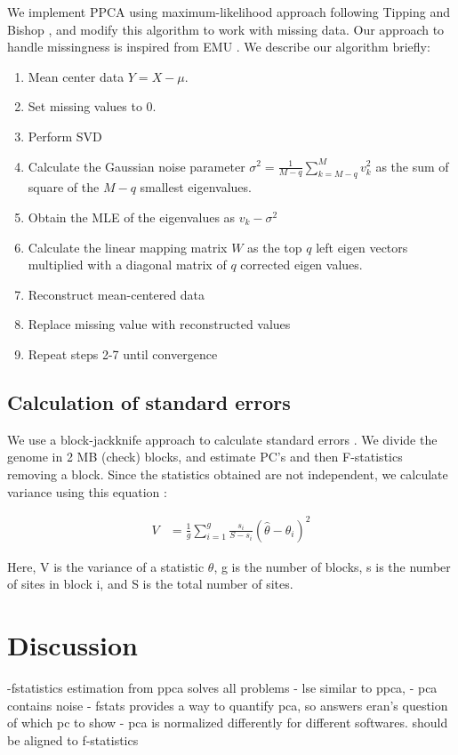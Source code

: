 \documentclass[12pt, letterpaper]{article}
\begin{document}
We implement PPCA using maximum-likelihood approach following Tipping and Bishop \cite{tipping_probabilistic_nodate}, and modify this algorithm to work with missing data. Our approach to handle missingness is inspired from EMU \cite{emu}. We describe our algorithm briefly:
\begin{enumerate}
    \item Mean center data $Y = X - \mu$.
    \item Set missing values to 0.
    \item Perform SVD
    \item Calculate the Gaussian noise parameter $\sigma^2 = \frac{1}{M-q} \sum_{k=M-q}^ M v_k^2$ as the sum of square of the $M-q$ smallest eigenvalues.
    \item Obtain the MLE of the eigenvalues as $v_k - \sigma^2$
    \item Calculate the linear mapping matrix $W$ as the top $q$ left eigen vectors multiplied with a diagonal matrix of $q$ corrected eigen values. 
    \item Reconstruct mean-centered data
    \item Replace missing value with reconstructed values
    \item Repeat steps 2-7 until convergence
\end{enumerate}


\subsection{Calculation of standard errors}

We use a block-jackknife approach to calculate standard errors \cite{maier_limits_2022}. We divide the genome in 2 MB (check) blocks, and estimate PC's and then F-statistics removing a block. Since the statistics obtained are not independent, we calculate variance using this equation \cite{maier_limits_2022}:

\begin{align}\label{eq:bjk_var}
V &= \frac{1}{g} \sum_{i=1}^g \frac{s_i}{S-s_i} (\hat{\theta} - \theta_i)^2
\end{align}

Here, V is the variance of a statistic $\theta$, g is the number of blocks, s is the number of sites in block i, and S is the total number of sites.


\section{Discussion}
-fstatistics estimation from ppca solves all problems
- lse similar to ppca, 
- pca contains noise
- fstats provides a way to quantify pca, so answers eran's question of which pc to show
- pca is normalized differently for different softwares. should be aligned to f-statistics 
\end{document}
